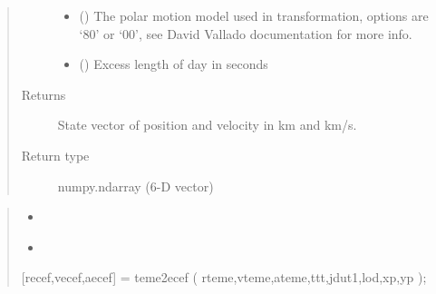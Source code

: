 \documentclass[letterpaper,10pt,english]{sphinxmanual}
\begin{document}
\begin{fulllineitems}
\begin{quote}
\begin{description}
\begin{itemize}
\item {} 
 () \textendash{} The polar motion model used in transformation, options are ‘80’ or ‘00’, see David Vallado documentation for more info.

\item {} 
 () \textendash{} Excess length of day in seconds

\end{itemize}

\item[{Returns}] \leavevmode
State vector of position and velocity in km and km/s.

\item[{Return type}] \leavevmode
numpy.ndarray (6-D vector)

\end{description}\end{quote}

\begin{quote}
\begin{itemize}
\item {} 
{\hyperref[\detokenize{modules/propagator_sgp4:propagator_sgp4.gstime}]{}}

\item {} 
{\hyperref[\detokenize{modules/propagator_sgp4:propagator_sgp4.polarm}]{}}

\end{itemize}

{[}recef,vecef,aecef{]} = teme2ecef  ( rteme,vteme,ateme,ttt,jdut1,lod,xp,yp );
\end{quote}

\end{fulllineitems}
\end{document}
